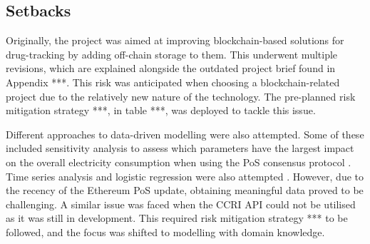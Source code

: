 \subsection{Setbacks}

Originally, the project was aimed at improving blockchain-based solutions for drug-tracking by adding off-chain storage to them. This underwent multiple revisions, which are explained alongside the outdated project brief found in Appendix ***. This risk was anticipated when choosing a blockchain-related project due to the relatively new nature of the technology. The pre-planned risk mitigation strategy ***, in table ***,  was deployed to tackle this issue.

Different approaches to data-driven modelling were also attempted. Some of these included sensitivity analysis to assess which parameters have the largest impact on the overall electricity consumption when using the PoS consensus protocol \cite{MarionAnModelling}. Time series analysis and logistic regression were also attempted \cite{IbanezTheExpansion}. However, due to the recency of the Ethereum PoS update, obtaining meaningful data proved to be challenging. A similar issue was faced when the CCRI API could not be utilised as it was still in development. This required risk mitigation strategy *** to be followed, and the focus was shifted to modelling with domain knowledge. 


